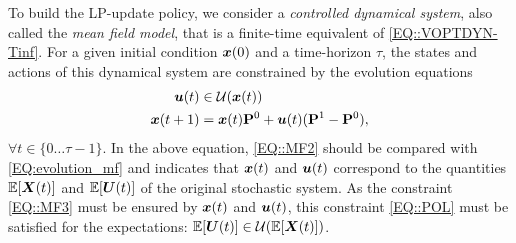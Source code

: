  


To build the LP-update policy, we consider a \emph{controlled dynamical system}, also called the \emph{mean field model}, that is a finite-time equivalent of \eqref{EQ::VOPTDYN-Tinf}. For a given initial condition ${\bm{x}}(0)$ and a time-horizon $\tau$, the states and actions of this dynamical system are constrained by the evolution equations 
\begin{subequations}
    \label{EQ:MeanField}
    \begin{align}
        \bm{u}(t) &\in \mathcal{U}({\bm{x}}(t))  \label{EQ::MF3} \\
        {\bm{x}}({t + 1}) &= {\bm{x}}(t) \mathbf{P}^{0}  + \bm{u}(t) (\mathbf{P}^{1} - \mathbf{P}^{0}) , \label{EQ::MF2}
    \end{align}
\end{subequations}
$\forall t\in\{0\dots \tau-1\}$. In the above equation, \eqref{EQ::MF2} should be compared with  \eqref{EQ:evolution_mf} and indicates that ${\bm{x}}(t)$ and $\bm{u}(t)$ correspond to the quantities $\mathbb{E}[{\bm{X}(t)}]$ and $\mathbb{E}[\bm{U}(t)]$ of the original stochastic system. As the constraint \eqref{EQ::MF3} must be ensured by ${\bm{x}}(t)$ and $\bm{u}(t)$, this constraint \eqref{EQ::POL} must be satisfied for the expectations: $\mathbb{E}[\bm{U}(t)]\in\mathcal{U}(\mathbb{E}[{\bm{X}(t)}])$.

